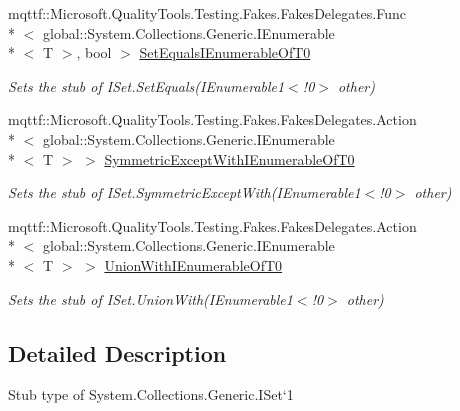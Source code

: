 \begin{DoxyCompactItemize}
mqttf\-::\-Microsoft.\-Quality\-Tools.\-Testing.\-Fakes.\-Fakes\-Delegates.\-Func\\*
$<$ global\-::\-System.\-Collections.\-Generic.\-I\-Enumerable\\*
$<$ T $>$, bool $>$ \hyperlink{class_system_1_1_collections_1_1_generic_1_1_fakes_1_1_stub_i_set_3_01_t_01_4_a4651276d9af1c5304b561e3ddfa8b12e}{Set\-Equals\-I\-Enumerable\-Of\-T0}
\begin{DoxyCompactList}\small\item\em Sets the stub of I\-Set{.\-Set\-Equals(I\-Enumerable}1$<$!0$>$ other)\end{DoxyCompactList}\item 
mqttf\-::\-Microsoft.\-Quality\-Tools.\-Testing.\-Fakes.\-Fakes\-Delegates.\-Action\\*
$<$ global\-::\-System.\-Collections.\-Generic.\-I\-Enumerable\\*
$<$ T $>$ $>$ \hyperlink{class_system_1_1_collections_1_1_generic_1_1_fakes_1_1_stub_i_set_3_01_t_01_4_aef18e5e113671e5b90298b686da3a514}{Symmetric\-Except\-With\-I\-Enumerable\-Of\-T0}
\begin{DoxyCompactList}\small\item\em Sets the stub of I\-Set{.\-Symmetric\-Except\-With(I\-Enumerable}1$<$!0$>$ other)\end{DoxyCompactList}\item 
mqttf\-::\-Microsoft.\-Quality\-Tools.\-Testing.\-Fakes.\-Fakes\-Delegates.\-Action\\*
$<$ global\-::\-System.\-Collections.\-Generic.\-I\-Enumerable\\*
$<$ T $>$ $>$ \hyperlink{class_system_1_1_collections_1_1_generic_1_1_fakes_1_1_stub_i_set_3_01_t_01_4_a381fbc052c2bf5eb2243af62bb78fe9f}{Union\-With\-I\-Enumerable\-Of\-T0}
\begin{DoxyCompactList}\small\item\em Sets the stub of I\-Set{.\-Union\-With(I\-Enumerable}1$<$!0$>$ other)\end{DoxyCompactList}\end{DoxyCompactItemize}


\subsection{Detailed Description}
Stub type of System.\-Collections.\-Generic.\-I\-Set`1



